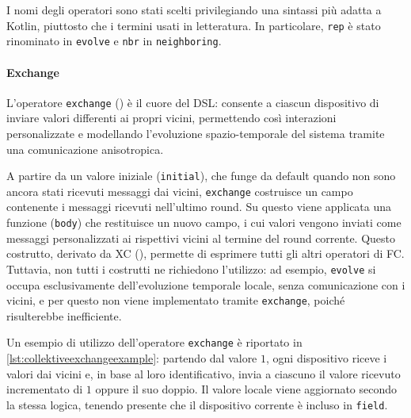 I nomi degli operatori sono stati scelti privilegiando una sintassi più adatta a Kotlin, piuttosto che i termini usati in letteratura. In particolare, \texttt{rep} è stato rinominato in \texttt{evolve} e \texttt{nbr} in \texttt{neighboring}.

\paragraph{Exchange}
\label{sec:collektiveexchange}

L’operatore \texttt{exchange} () è il cuore del DSL: consente a ciascun dispositivo di inviare valori differenti ai propri vicini, permettendo così interazioni personalizzate e modellando l’evoluzione spazio-temporale del sistema tramite una comunicazione anisotropica.



A partire da un valore iniziale (\texttt{initial}), che funge da default quando non sono ancora stati ricevuti messaggi dai vicini, \texttt{exchange} costruisce un campo contenente i messaggi ricevuti nell'ultimo round. Su questo viene applicata una funzione (\texttt{body}) che restituisce un nuovo campo, i cui valori vengono inviati come messaggi personalizzati ai rispettivi vicini al termine del round corrente.
%
Questo costrutto, derivato da \ac{XC} (), permette di esprimere tutti gli altri operatori di \ac{FC}. Tuttavia, non tutti i costrutti ne richiedono l'utilizzo: ad esempio, \texttt{evolve} si occupa esclusivamente dell'evoluzione temporale locale, senza comunicazione con i vicini, e per questo non viene implementato tramite \texttt{exchange}, poiché risulterebbe inefficiente.

Un esempio di utilizzo dell’operatore \texttt{exchange} è riportato in \cref{lst:collektiveexchangeexample}: partendo dal valore \(1\), ogni dispositivo riceve i valori dai vicini e, in base al loro identificativo, invia a ciascuno il valore ricevuto incrementato di \(1\) oppure il suo doppio. Il valore locale viene aggiornato secondo la stessa logica, tenendo presente che il dispositivo corrente è incluso in \texttt{field}.




